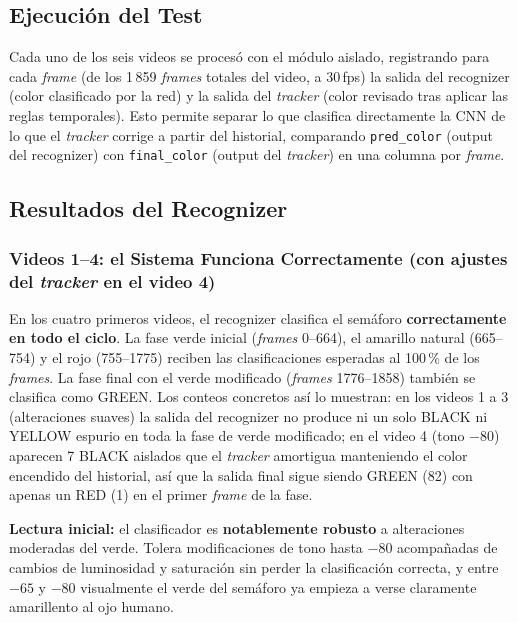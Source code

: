 \subsection{Ejecución del Test}

Cada uno de los seis videos se procesó con el módulo aislado, registrando para cada \textit{frame} (de los 1\,859 \textit{frames} totales del video, a 30\,fps) la salida del recognizer (color clasificado por la red) y la salida del \textit{tracker} (color revisado tras aplicar las reglas temporales). Esto permite separar lo que clasifica directamente la CNN de lo que el \textit{tracker} corrige a partir del historial, comparando \texttt{pred\_color} (output del recognizer) con \texttt{final\_color} (output del \textit{tracker}) en una columna por \textit{frame}.

\subsection{Resultados del Recognizer}

\subsubsection{Videos 1--4: el Sistema Funciona Correctamente (con ajustes del \textit{tracker} en el video 4)}

En los cuatro primeros videos, el recognizer clasifica el semáforo \textbf{correctamente en todo el ciclo}. La fase verde inicial (\textit{frames} 0--664), el amarillo natural (665--754) y el rojo (755--1775) reciben las clasificaciones esperadas al 100\,\% de los \textit{frames}. La fase final con el verde modificado (\textit{frames} 1776--1858) también se clasifica como GREEN. Los conteos concretos así lo muestran: en los videos 1 a 3 (alteraciones suaves) la salida del recognizer no produce ni un solo BLACK ni YELLOW espurio en toda la fase de verde modificado; en el video 4 (tono $-80$) aparecen 7 BLACK aislados que el \textit{tracker} amortigua manteniendo el color encendido del historial, así que la salida final sigue siendo GREEN (82) con apenas un RED (1) en el primer \textit{frame} de la fase.

\textbf{Lectura inicial:} el clasificador es \textbf{notablemente robusto} a alteraciones moderadas del verde. Tolera modificaciones de tono hasta $-80$ acompañadas de cambios de luminosidad y saturación sin perder la clasificación correcta, y entre $-65$ y $-80$ visualmente el verde del semáforo ya empieza a verse claramente amarillento al ojo humano.

